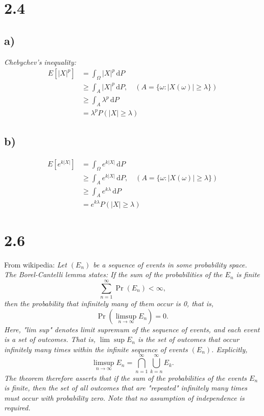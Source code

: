 \documentclass[11pt,letterpaper]{article} \usepackage[latin1]{inputenc}
\newcommand{\ud}{\,\mathrm{d}} \newcommand{\p}{\partial}
\begin{document}
\section*{2.4}
\subsection*{a)} \textit{Chebychev's inequality:}
\begin{align}
  E[|X|^p] &= \int_\Omega |X|^p \ud P \nonumber \\
  &\geq \int_A |X|^p \ud P, \quad (A=\{\omega: |X(\omega)|\geq \lambda\})  \nonumber \\
  &\geq \int_A \lambda ^p \ud P \nonumber \\
  &=\lambda ^p P(|X| \geq \lambda)
  \label{}
\end{align}
\subsection*{b)}
\begin{align}
  E\left[ e^{k|X|} \right] &= \int_\Omega e^{k|X|}\ud P \nonumber \\
    &\geq \int_A e^{k|X|} \ud P, \quad (A=\{\omega: |X(\omega)|\geq \lambda\})  \nonumber \\
    &\geq \int_A e^{k\lambda} \ud P \nonumber \\
    &=e^{k\lambda} P(|X| \geq \lambda)
  \label{}
\end{align}

\section*{2.6}
From wikipedia:
\textit{
Let $(E_n)$ be a sequence of events in some probability space. The Borel-Cantelli lemma states:
If the sum of the probabilities of the $E_n$ is finite
\begin{equation}
\sum_{n=1}^\infty \Pr(E_n)<\infty,
\end{equation}
then the probability that infinitely many of them occur is 0, that is,
\begin{equation}
  \Pr\left(\limsup_{n\to\infty} E_n\right) = 0.\,
\end{equation}
Here, "lim sup" denotes limit supremum of the sequence of events, and each
event is a set of outcomes. That is, $\lim \sup E_n$ is the set of outcomes that
occur infinitely many times within the infinite sequence of events $(E_n)$.
Explicitly,
\begin{equation}
\limsup_{n\to\infty} E_n = \bigcap_{n=1}^{\infty} \bigcup_{k=n}^{\infty} E_k.
\end{equation}
The theorem therefore asserts that if the sum of the probabilities of the
events $E_n$ is finite, then the set of all outcomes that are "repeated"
infinitely many times must occur with probability zero. Note that no assumption
of independence is required.
}  
\end{document}
